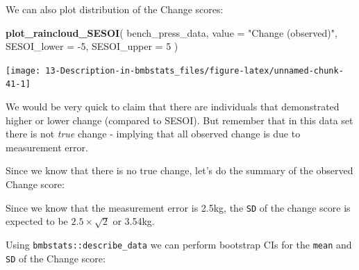 \documentclass[
]{book}
\newenvironment{Shaded}{\begin{snugshade}}{\end{snugshade}}
\newcommand{\CommentTok}[1]{\textcolor[rgb]{0.56,0.35,0.01}{\textit{#1}}}
\newcommand{\DataTypeTok}[1]{\textcolor[rgb]{0.13,0.29,0.53}{#1}}
\newcommand{\DecValTok}[1]{\textcolor[rgb]{0.00,0.00,0.81}{#1}}
\newcommand{\KeywordTok}[1]{\textcolor[rgb]{0.13,0.29,0.53}{\textbf{#1}}}
\newcommand{\NormalTok}[1]{#1}
\newcommand{\OperatorTok}[1]{\textcolor[rgb]{0.81,0.36,0.00}{\textbf{#1}}}
\newcommand{\StringTok}[1]{\textcolor[rgb]{0.31,0.60,0.02}{#1}}
\begin{document}
We can also plot distribution of the Change scores:

\begin{Shaded}
\begin{Highlighting}[]
\KeywordTok{plot\_raincloud\_SESOI}\NormalTok{(}
\NormalTok{  bench\_press\_data,}
  \DataTypeTok{value =} \StringTok{"Change (observed)"}\NormalTok{,}
  \DataTypeTok{SESOI\_lower =} \DecValTok{{-}5}\NormalTok{,}
  \DataTypeTok{SESOI\_upper =} \DecValTok{5}
\NormalTok{)}
\end{Highlighting}
\end{Shaded}

\begin{center}\texttt{[image: 13-Description-in-bmbstats\_files/figure-latex/unnamed-chunk-41-1]} \end{center}

We would be very quick to claim that there are individuals that demonstrated higher or lower change (compared to SESOI). But remember that in this data set there is not \emph{true} change - implying that all observed change is due to measurement error.

Since we know that there is no true change, let's do the summary of the observed Change score:

\begin{Shaded}
\end{Shaded}

\begin{Shaded}
\end{Shaded}

Since we know that the measurement error is 2.5kg, the \texttt{SD} of the change score is expected to be \(2.5 \times \sqrt{2}\) or 3.54kg.

Using \texttt{bmbstats::describe\_data} we can perform bootstrap CIs for the \texttt{mean} and \texttt{SD} of the Change score:
\end{document}

